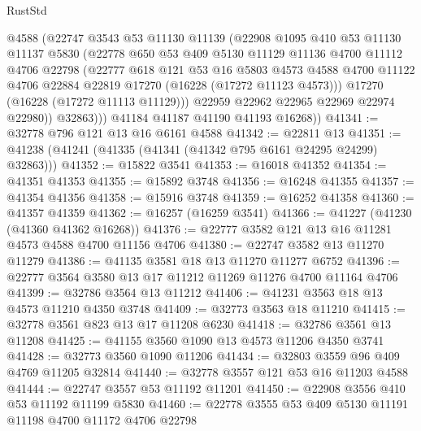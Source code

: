\begin{lexlean}{RustStd}
\begin{coremodule}
              @4588
              (@22747
                @3543
                @53
                @11130
                @11139
                (@22908
                  @1095
                  @410
                  @53
                  @11130
                  @11137
                  @5830
                  (@22778
                    @650
                    @53
                    @409
                    @5130
                    @11129
                    @11136
                    @4700
                    @11112
                    @4706
                    @22798
                    (@22777
                      @618
                      @121
                      @53
                      @16
                      @5803
                      @4573
                      @4588
                      @4700
                      @11122
                      @4706
                      @22884
                      @22819
                      @17270
                      (@16228 (@17272 @11123 @4573)))
                    @17270
                    (@16228 (@17272 @11113 @11129)))
                  @22959
                  @22962
                  @22965
                  @22969
                  @22974
                  @22980))
              @32863)))
        @41184
        @41187
        @41190
        @41193
        @16268))
@41341 := @32778 @796 @121 @13 @16 @6161 @4588
@41342 := @22811 @13
@41351 := @41238 (@41241 (@41335 (@41341 (@41342 @795 @6161 @24295 @24299) @32863)))
@41352 := @15822 @3541
@41353 := @16018 @41352
@41354 := @41351 @41353
@41355 := @15892 @3748
@41356 := @16248 @41355
@41357 := @41354 @41356
@41358 := @15916 @3748
@41359 := @16252 @41358
@41360 := @41357 @41359
@41362 := @16257 (@16259 @3541)
@41366 := @41227 (@41230 (@41360 @41362 @16268))
@41376 := @22777 @3582 @121 @13 @16 @11281 @4573 @4588 @4700 @11156 @4706
@41380 := @22747 @3582 @13 @11270 @11279
@41386 := @41135 @3581 @18 @13 @11270 @11277 @6752
@41396 := @22777 @3564 @3580 @13 @17 @11212 @11269 @11276 @4700 @11164 @4706
@41399 := @32786 @3564 @13 @11212
@41406 := @41231 @3563 @18 @13 @4573 @11210 @4350 @3748
@41409 := @32773 @3563 @18 @11210
@41415 := @32778 @3561 @823 @13 @17 @11208 @6230
@41418 := @32786 @3561 @13 @11208
@41425 := @41155 @3560 @1090 @13 @4573 @11206 @4350 @3741
@41428 := @32773 @3560 @1090 @11206
@41434 := @32803 @3559 @96 @409 @4769 @11205 @32814
@41440 := @32778 @3557 @121 @53 @16 @11203 @4588
@41444 := @22747 @3557 @53 @11192 @11201
@41450 := @22908 @3556 @410 @53 @11192 @11199 @5830
@41460 := @22778 @3555 @53 @409 @5130 @11191 @11198 @4700 @11172 @4706 @22798

\end{coremodule}
\end{lexlean}
